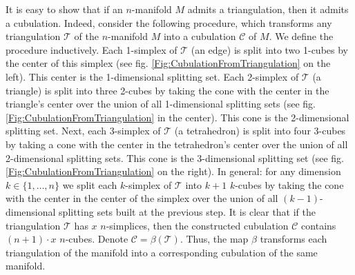 \documentclass{amsart}
\begin{document}
It is easy to show that if an $n$-manifold $M$ admits a triangulation, then it admits a cubulation. Indeed, consider the following procedure, which transforms any triangulation $\mathcal{T}$ of the $n$-manifold $M$ into a cubulation $\mathcal{C}$ of $M$. We define the procedure inductively. Each 1-simplex of $\mathcal{T}$ (an edge) is split into two 1-cubes by the center of this simplex (see fig. \ref{Fig:CubulationFromTriangulation} on the left). This center is the 1-dimensional splitting set. Each 2-simplex of $\mathcal{T}$ (a triangle) is split into three 2-cubes by taking the cone with the center in the triangle's center over the union of all 1-dimensional splitting sets (see fig. \ref{Fig:CubulationFromTriangulation} in the center). This cone is the 2-dimensional splitting set. Next, each 3-simplex of $\mathcal{T}$ (a tetrahedron) is split into four 3-cubes by taking a cone with the center in the tetrahedron's center over the union of all 2-dimensional splitting sets. This cone is the 3-dimensional splitting set (see fig. \ref{Fig:CubulationFromTriangulation} on the right). In general: for any dimension $k\in\{1, \ldots, n\}$ we split each $k$-simplex of $\mathcal{T}$ into $k + 1$ $k$-cubes by taking the cone with the center in the center of the simplex over the union of all $(k - 1)$-dimensional splitting sets built at the previous step. It is clear that if the triangulation $\mathcal{T}$ has $x$ $n$-simplices, then the constructed cubulation $\mathcal{C}$ contains $(n + 1)\cdot x$ $n$-cubes. Denote $\mathcal{C} = \beta(\mathcal{T})$. Thus, the map $\beta$ transforms each triangulation of the manifold into a corresponding cubulation of the same manifold.
\end{document}
